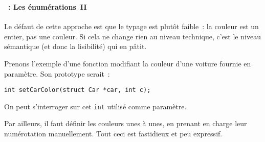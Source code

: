 \begin{frame}[containsverbatim]
  \frametitle{\secname}
  \framesubtitle{\subsecname~: Les énumérations~II} 
  
  Le défaut de cette approche est que le typage est plutôt faible~: la couleur est un entier, pas une couleur. Si
  cela ne change rien au niveau technique, c'est le niveau sémantique (et donc la lisibilité) qui en pâtit.
  \vspace{0.3cm}
  \par
  Prenons l'exemple d'une fonction modifiant la couleur d'une voiture fournie en paramètre. Son prototype serait~:
  \begin{verbatim}
int setCarColor(struct Car *car, int c);\end{verbatim}
  \vspace{0.3cm}
  \par
  On peut s'interroger sur cet \verb|int| utilisé comme paramètre.
  \par
  Par ailleurs, il faut définir les couleurs unes à unes, en prenant en charge leur numérotation manuellement.
  Tout ceci est fastidieux et peu expressif.
\end{frame}

